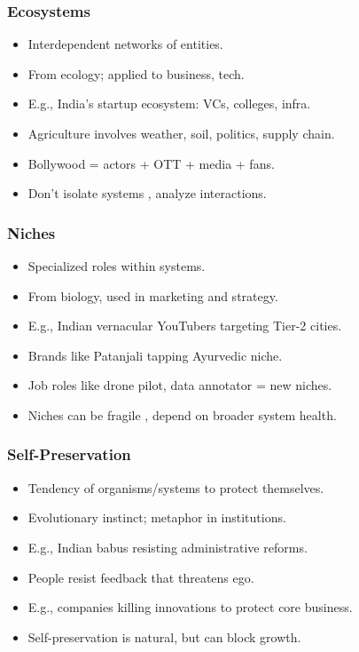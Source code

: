\begin{frame}[fragile]\frametitle{Ecosystems}
  \begin{itemize}
    \item Interdependent networks of entities.
    \item From ecology; applied to business, tech.
    \item E.g., India's startup ecosystem: VCs, colleges, infra.
    \item Agriculture involves weather, soil, politics, supply chain.
    \item Bollywood = actors + OTT + media + fans.
    \item Don't isolate systems , analyze interactions.
  \end{itemize}
\end{frame}

\begin{frame}[fragile]\frametitle{Niches}
  \begin{itemize}
    \item Specialized roles within systems.
    \item From biology, used in marketing and strategy.
    \item E.g., Indian vernacular YouTubers targeting Tier-2 cities.
    \item Brands like Patanjali tapping Ayurvedic niche.
    \item Job roles like drone pilot, data annotator = new niches.
    \item Niches can be fragile , depend on broader system health.
  \end{itemize}
\end{frame}

\begin{frame}[fragile]\frametitle{Self-Preservation}
  \begin{itemize}
    \item Tendency of organisms/systems to protect themselves.
    \item Evolutionary instinct; metaphor in institutions.
    \item E.g., Indian babus resisting administrative reforms.
    \item People resist feedback that threatens ego.
    \item E.g., companies killing innovations to protect core business.
    \item Self-preservation is natural, but can block growth.
  \end{itemize}
\end{frame}

